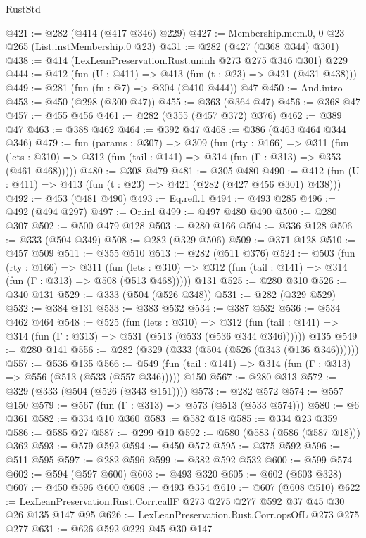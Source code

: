\begin{lexlean}{RustStd}
\begin{coremodule}
@421 := @282 (@414 (@417 @346) @229)
@427 := Membership.mem.{0, 0} @23 @265 (List.instMembership.{0} @23)
@431 := @282 (@427 (@368 @344) @301)
@438 := @414 (LexLeanPreservation.Rust.uninh @273 @275 @346 @301) @229
@444 := @412 (fun (U : @411) => @413 (fun (t : @23) => @421 (@431 @438)))
@449 := @281 (fun (fn : @7) => @304 (@410 @444)) @47
@450 := And.intro
@453 := @450 (@298 (@300 @47))
@455 := @363 (@364 @47)
@456 := @368 @47
@457 := @455 @456
@461 := @282 (@355 (@457 @372) @376)
@462 := @389 @47
@463 := @388 @462
@464 := @392 @47
@468 := @386 (@463 @464 @344 @346)
@479 := fun (params : @307) =>
  @309
    (fun (rty : @166) =>
    @311
      (fun (lets : @310) => @312 (fun (tail : @141) => @314 (fun (Γ : @313) => @353 (@461 @468)))))
@480 := @308 @479
@481 := @305 @480
@490 := @412 (fun (U : @411) => @413 (fun (t : @23) => @421 (@282 (@427 @456 @301) @438)))
@492 := @453 (@481 @490)
@493 := Eq.refl.{1}
@494 := @493 @285
@496 := @492 (@494 @297)
@497 := Or.inl
@499 := @497 @480 @490
@500 := @280 @307
@502 := @500 @479 @128
@503 := @280 @166
@504 := @336 @128
@506 := @333 (@504 @349)
@508 := @282 (@329 @506)
@509 := @371 @128
@510 := @457 @509
@511 := @355 @510
@513 := @282 (@511 @376)
@524 := @503
    (fun (rty : @166) =>
    @311
      (fun (lets : @310) => @312 (fun (tail : @141) => @314 (fun (Γ : @313) => @508 (@513 @468)))))
    @131
@525 := @280 @310
@526 := @340 @131
@529 := @333 (@504 (@526 @348))
@531 := @282 (@329 @529)
@532 := @384 @131
@533 := @383 @532
@534 := @387 @532
@536 := @534 @462 @464
@548 := @525
    (fun (lets : @310) =>
    @312 (fun (tail : @141) => @314 (fun (Γ : @313) => @531 (@513 (@533 (@536 @344 @346))))))
    @135
@549 := @280 @141
@556 := @282 (@329 (@333 (@504 (@526 (@343 (@136 @346))))))
@557 := @536 @135
@566 := @549 (fun (tail : @141) => @314 (fun (Γ : @313) => @556 (@513 (@533 (@557 @346))))) @150
@567 := @280 @313
@572 := @329 (@333 (@504 (@526 (@343 @151))))
@573 := @282 @572
@574 := @557 @150
@579 := @567 (fun (Γ : @313) => @573 (@513 (@533 @574)))
@580 := @6 @361
@582 := @334 @10 @360
@583 := @582 @18
@585 := @334 @23 @359
@586 := @585 @27
@587 := @299 @10
@592 := @580 (@583 (@586 (@587 @18))) @362
@593 := @579 @592
@594 := @450 @572
@595 := @375 @592
@596 := @511 @595
@597 := @282 @596
@599 := @382 @592 @532
@600 := @599 @574
@602 := @594 (@597 @600)
@603 := @493 @320
@605 := @602 (@603 @328)
@607 := @450 @596 @600
@608 := @493 @354
@610 := @607 (@608 @510)
@622 := LexLeanPreservation.Rust.Corr.callF @273 @275 @277 @592 @37 @45 @30 @26 @135 @147 @95
@626 := LexLeanPreservation.Rust.Corr.opsOfL @273 @275 @277
@631 := @626 @592 @229 @45 @30 @147

\end{coremodule}
\end{lexlean}
